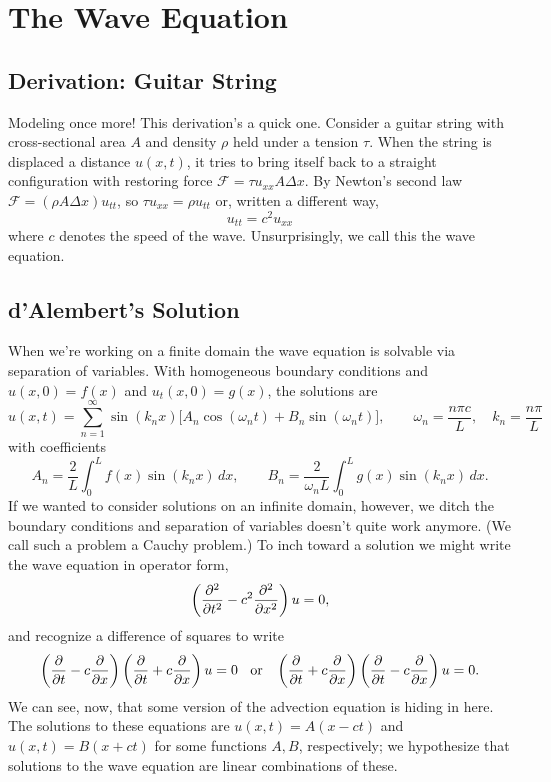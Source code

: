 \documentclass[../m180main.tex]{subfiles}
\begin{document}
\chapter{The Wave Equation}
\section{Derivation: Guitar String}
Modeling once more!
This derivation's a quick one.
Consider a guitar string with cross-sectional area $A$ and density $\rho$ held under a tension $\tau$.
When the string is displaced a distance $u(x,t)$, it tries to bring itself back to a straight configuration with restoring force $\mathcal F = \tau u_{xx} A \Delta x$.
By Newton's second law $\mathcal F = (\rho A \Delta x) u_{tt}$, so $\tau u_{xx} = \rho u_{tt}$ or, written a different way,
\[ u_{tt} = c^2 u_{xx} \]
where $c$ denotes the speed of the wave.
Unsurprisingly, we call this the wave equation.

\section{d'Alembert's Solution}
When we're working on a finite domain the wave equation is solvable via separation of variables.
With homogeneous boundary conditions and $u(x,0) = f(x)$ and $u_t(x,0) = g(x)$, the solutions are
\[ u(x,t) = \sum_{n=1}^{\infty} \sin (k_n x) \big[ A_n \cos (\omega_n t) + B_n \sin(\omega_n t) \big], \qquad \omega_n = \frac{n\pi c}{L}, \quad k_n = \frac{n\pi}{L} \]
with coefficients
\[ A_n = \frac{2}{L} \int_{0}^{L} f(x) \sin (k_n x) \,dx, \qquad B_n = \frac{2}{\omega_n L} \int_{0}^{L} g(x) \sin(k_n x) \,dx. \]
If we wanted to consider solutions on an infinite domain, however, we ditch the boundary conditions and separation of variables doesn't quite work anymore.
(We call such a problem a Cauchy problem.)
To inch toward a solution we might write the wave equation in operator form,
\[ \left( \frac{\partial^2}{\partial t^2} - c^2 \frac{\partial^2}{\partial x^2} \right) u = 0, \]
and recognize a difference of squares to write
\[ \left( \frac{\partial}{\partial t} - c \frac{\partial}{\partial x} \right) \left( \frac{\partial}{\partial t} + c \frac{\partial}{\partial x} \right) u = 0 \;\;\text{ or }\;\; \left( \frac{\partial}{\partial t} + c \frac{\partial}{\partial x} \right) \left( \frac{\partial}{\partial t} - c \frac{\partial}{\partial x} \right) u = 0. \]
We can see, now, that some version of the advection equation is hiding in here.
The solutions to these equations are $u(x,t) = A(x - ct)$ and $u(x,t) = B(x + ct)$ for some functions $A,B$, respectively; we hypothesize that solutions to the wave equation are linear combinations of these.
\end{document}

